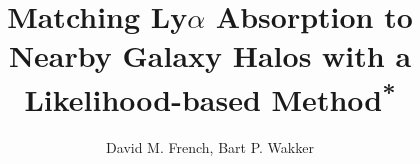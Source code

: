 \documentclass[iop]{emulateapj-rtx4}
\begin{document}

\title{Matching Ly$\alpha$ Absorption to Nearby Galaxy Halos with a Likelihood-based Method\textsuperscript{*}}


\author{David M. French, Bart P. Wakker}

\end{document}
